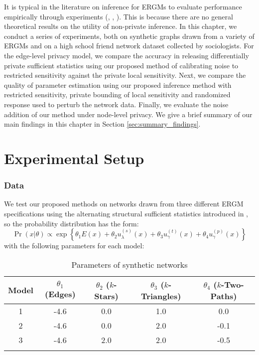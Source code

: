   It is typical in the literature on inference for ERGMs to evaluate performance empirically through experiments  (\cite{HH06}, \cite{LM14}, \cite{HG10}). This is because there are no general theoretical results on the utility of non-private inference. In this chapter, we conduct a series of experiments, both on synthetic graphs drawn from a variety of ERGMs and on a high school friend network dataset collected by sociologists. For the edge-level privacy model, we compare the accuracy in releasing differentially private sufficient statistics using our proposed method of calibrating noise to restricted sensitivity against the private local sensitivity. Next, we compare the quality of parameter estimation using our proposed inference method with restricted sensitivity, private bounding of local sensitivity and randomized response used to perturb the network data. Finally, we evaluate the noise addition of our method under node-level privacy. We give a brief summary of our main findings in this chapter in Section \ref{sec:summary_findings}.
  
 
 \section{Experimental Setup}\label{sec:setup}
 
 \subsubsection*{Data}
 	We test our proposed methods on networks drawn from three different ERGM specifications using the alternating structural sufficient statistics introduced in , so the probability distribution has the form:
 	$$\Pr(x | \theta) \propto \exp\left\{\theta_1 E(x) + \theta_2 u_\lambda^{(s)}(x) + \theta_3 u_\gamma^{(t)}(x)  + \theta_4 u_\gamma^{(p)}(x)\right\} $$
 	 with the following parameters for each model:
 	\begin{table}[!ht]
 		\centering
 		\begin{tabular}{|c|c|c|c|c|}
 			\hhline{|=====|}
 			Model & $\theta_1$ (Edges) & $\theta_2$ ($k$-Stars) & $\theta_3$ ($k$-Triangles) & $\theta_4$ ($k$-Two-Paths) \\ \hline
			1 & -4.6 & 0.0 & 1.0 & 0.0  \\
			2 & -4.6 & 0.0 & 2.0 & -0.1 \\
			3 & -4.6 & 2.0 & 2.0 & -0.5 \\
			\hhline{|=====|}
 		\end{tabular}
 	\caption{Parameters of synthetic networks}
 	\label{table:ergm_params}
 	\end{table}
 
